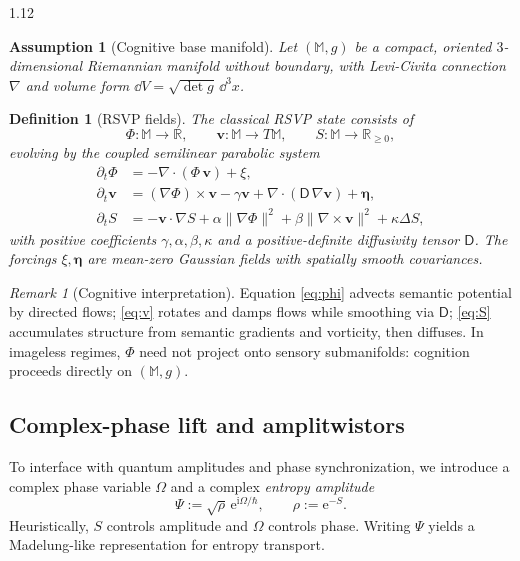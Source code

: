 \documentclass[12pt,a4paper]{article}
\numberwithin{equation}{section}
\newtheorem{definition}{Definition}[section]
\newtheorem{assumption}{Assumption}[section]
\theoremstyle{remark}
\newtheorem{remark}{Remark}[section]
\theoremstyle{definition}
\newcommand{\M}{\mathbb{M}}
\newcommand{\R}{\mathbb{R}}
\newcommand{\ii}{\mathrm{i}}
\newcommand{\ee}{\mathrm{e}}
\begin{document}
\begin{spacing}{1.12}
\begin{assumption}[Cognitive base manifold]
\label{ass:manifold}
Let $(\M,g)$ be a compact, oriented $3$-dimensional Riemannian manifold without boundary, with Levi-Civita connection $\nabla$ and volume form $\dd V=\sqrt{\det g}\,\dd^3x$.
\end{assumption}

\begin{definition}[RSVP fields]
\label{def:rsvp-fields}
The classical RSVP state consists of
\[
\Phi:\M\to\R,\qquad \mathbf{v}:\M\to T\M,\qquad S:\M\to\R_{\ge 0},
\]
evolving by the coupled semilinear parabolic system
\begin{align}
\partial_t \Phi &= -\nabla\!\cdot(\Phi\,\mathbf{v}) + \xi, \label{eq:phi}\\
\partial_t \mathbf{v} &= (\nabla\Phi)\times \mathbf{v} - \gamma \mathbf{v}
+ \nabla\!\cdot(\mathsf{D}\,\nabla \mathbf{v}) + \boldsymbol{\eta}, \label{eq:v}\\
\partial_t S &= -\mathbf{v}\!\cdot\nabla S + \alpha \|\nabla \Phi\|^2
+ \beta \|\nabla\times \mathbf{v}\|^2 + \kappa \Delta S, \label{eq:S}
\end{align}
with positive coefficients $\gamma,\alpha,\beta,\kappa$ and a positive-definite diffusivity tensor $\mathsf{D}$. The forcings $\xi,\boldsymbol{\eta}$ are mean-zero Gaussian fields with spatially smooth covariances.
\end{definition}

\begin{remark}[Cognitive interpretation]
Equation \eqref{eq:phi} advects semantic potential by directed flows; \eqref{eq:v} rotates and damps flows while smoothing via $\mathsf{D}$; \eqref{eq:S} accumulates structure from semantic gradients and vorticity, then diffuses. In imageless regimes, $\Phi$ need not project onto sensory submanifolds: cognition proceeds directly on $(\M,g)$.
\end{remark}

\subsection{Complex-phase lift and amplitwistors}
\label{subsec:complex-lift}

To interface with quantum amplitudes and phase synchronization, we introduce a complex phase variable $\Omega$ and a complex \emph{entropy amplitude}
\begin{equation}
\Psi := \sqrt{\rho}\,\ee^{\ii \Omega/\hbar},\qquad \rho := \ee^{-S}.
\label{eq:Psi-def}
\end{equation}
Heuristically, $S$ controls amplitude and $\Omega$ controls phase. Writing $\Psi$ yields a Madelung-like representation for entropy transport.


\end{spacing}
\end{document}
